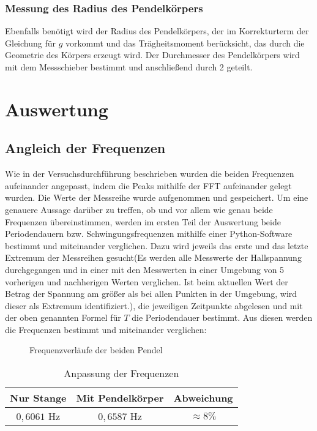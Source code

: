 \documentclass[a4paper, 11pt]{article}
\begin{document}
\subsubsection{Messung des Radius des Pendelkörpers}
Ebenfalls benötigt wird der Radius des Pendelkörpers, der im Korrekturterm der Gleichung für $g$ vorkommt und das Trägheitsmoment berücksicht, das durch die Geometrie des Körpers erzeugt wird. Der Durchmesser des Pendelkörpers wird mit dem Messschieber bestimmt und anschließend durch 2 geteilt. 
\newpage

\section{Auswertung}
\subsection{Angleich der Frequenzen}
Wie in der Versuchsdurchführung beschrieben wurden die beiden Frequenzen aufeinander angepasst, indem die Peaks mithilfe der FFT aufeinander gelegt wurden. Die Werte der Messreihe wurde aufgenommen und gespeichert. Um eine genauere Aussage darüber zu treffen, ob und vor allem wie genau beide Frequenzen übereinstimmen, werden im ersten Teil der Auswertung beide Periodendauern bzw. Schwingungsfrequenzen mithilfe einer Python-Software bestimmt und miteinander verglichen. Dazu wird jeweils das erste und das letzte Extremum der Messreihen gesucht(Es werden alle Messwerte der Hallspannung durchgegangen und in einer mit den Messwerten in einer Umgebung von 5 vorherigen und nachherigen Werten verglichen. Ist beim aktuellen Wert der Betrag der Spannung am größer als bei allen Punkten in der Umgebung, wird dieser als Extremum identifiziert.), die jeweiligen Zeitpunkte abgelesen und mit der oben genannten Formel für $T$ die Periodendauer bestimmt. Aus diesen werden die Frequenzen bestimmt und miteinander verglichen:
\\

\begin{figure} [H]
\centering
	\caption{Frequenzverläufe der beiden Pendel}
	\label{pic:Abbildung 4}
\end{figure}

\begin{table}[H]
	\large
	\centering
	\begin{tabular}{|c|c|c|}
		\hline 	Nur Stange & Mit Pendelkörper &	Abweichung \\
		\hline	$0,6061$ Hz	&	$0,6587$ Hz		&	$\approx 8\%$ \\
		\hline
	\end{tabular}
	\caption{Anpassung der Frequenzen}
\end{table}
 
\end{document}
